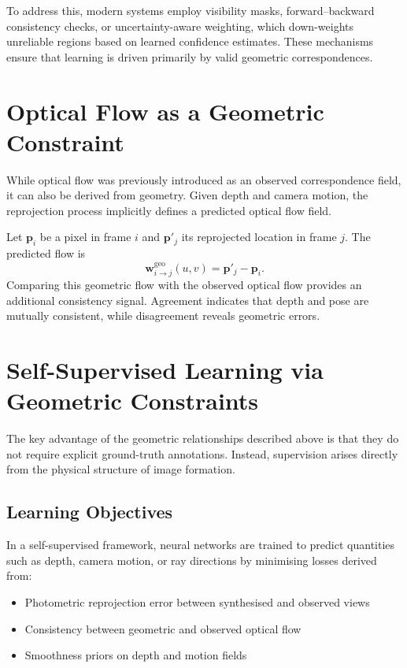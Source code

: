 To address this, modern systems employ visibility masks, forward--backward consistency checks, or uncertainty-aware weighting, which down-weights unreliable regions based on learned confidence estimates. These mechanisms ensure that learning is driven primarily by valid geometric correspondences.

\section{Optical Flow as a Geometric Constraint}
While optical flow was previously introduced as an observed correspondence field, it can also be derived from geometry. Given depth and camera motion, the reprojection process implicitly defines a predicted optical flow field.

Let $\mathbf{p}_i$ be a pixel in frame $i$ and $\mathbf{p}'_j$ its reprojected location in frame $j$. The predicted flow is
\begin{equation}
    \mathbf{w}^{\text{geo}}_{i\to j}(u,v) = \mathbf{p}'_j - \mathbf{p}_i.
\end{equation}
Comparing this geometric flow with the observed optical flow provides an additional consistency signal. Agreement indicates that depth and pose are mutually consistent, while disagreement reveals geometric errors.

\section{Self-Supervised Learning via Geometric Constraints}
The key advantage of the geometric relationships described above is that they do not require explicit ground-truth annotations. Instead, supervision arises directly from the physical structure of image formation.

\subsection{Learning Objectives}
In a self-supervised framework, neural networks are trained to predict quantities such as depth, camera motion, or ray directions by minimising losses derived from:

\begin{itemize}
    \item Photometric reprojection error between synthesised and observed views
    \item Consistency between geometric and observed optical flow
    \item Smoothness priors on depth and motion fields
\end{itemize}

